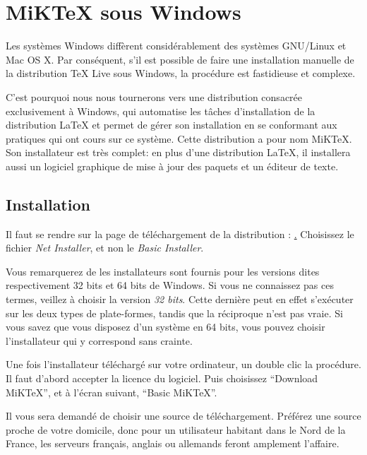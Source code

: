 \section{MiKTeX sous Windows}


Les systèmes Windows diffèrent considérablement des systèmes GNU/Linux et Mac OS X. Par conséquent, s'il est possible de faire une installation manuelle de la distribution TeX Live sous Windows, la procédure est fastidieuse et complexe.

C'est pourquoi nous nous tournerons vers une distribution consacrée exclusivement à Windows, qui automatise les tâches d'installation de la distribution \LaTeX{} et permet de gérer son installation en se conformant aux pratiques qui ont cours sur ce système. Cette distribution a pour nom MiKTeX. Son installateur est très complet: en plus d'une distribution \LaTeX{}, il installera aussi un logiciel graphique de mise à jour des paquets et un éditeur de texte.

\subsection{Installation}

Il faut se rendre sur la page de téléchargement de la distribution : \href{http://miktex.org/2.9/setup}. Choisissez le fichier \emph{Net Installer}, et non le \emph{Basic Installer}.

\begin{attention}
Vous remarquerez de les installateurs sont fournis pour les versions dites respectivement 32 bits et 64 bits de Windows. Si vous ne connaissez pas ces termes, veillez à choisir la version \emph{32 bits}. Cette dernière peut en effet s'exécuter sur les deux types de plate-formes, tandis que la réciproque n'est pas vraie. Si vous savez que vous disposez d'un système en 64 bits, vous pouvez choisir l'installateur qui y correspond sans crainte.
\end{attention}

Une fois l'installateur téléchargé sur votre ordinateur, un double clic la procédure. Il faut d'abord accepter la licence du logiciel. Puis choisissez \enquote{Download MiKTeX}, et à l'écran suivant, \enquote{Basic MiKTeX}.

Il vous sera demandé de choisir une source de téléchargement. Préférez une source proche de votre domicile, donc pour un utilisateur habitant dans le Nord de la France, les serveurs français, anglais ou allemands feront amplement l'affaire.

